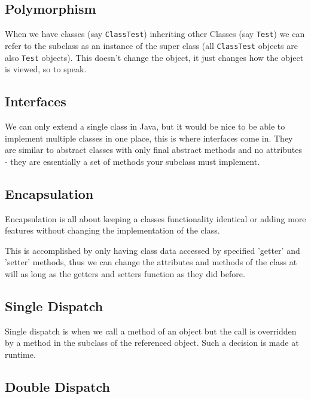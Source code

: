 \documentclass[a4paper, 12pt, twoside]{article}
\begin{document}
\subsection{Polymorphism}

When we have classes (say \texttt{ClassTest}) inheriting other Classes
(say \texttt{Test}) we can refer to the subclass as an instance
of the super class (all \texttt{ClassTest} objects are also
\texttt{Test} objects). This doesn't change the object, it just changes
how the object is viewed, so to speak.

\subsection{Interfaces}

We can only extend a single class in Java, but it would be nice to
be able to implement multiple classes in one place, this is where
interfaces come in. They are similar to abstract classes with
only final abstract methods and no attributes - they are essentially
a set of methods your subclass must implement.

\subsection{Encapsulation}

Encapsulation is all about keeping a classes functionality identical
or adding more features without changing the implementation of the
class. 

\vspace{\baselineskip}

This is accomplished by only having class data accessed by
specified 'getter' and 'setter' methods, thus we can change the
attributes and methods of the class at will as long as the
getters and setters function as they did before.

\subsection{Single Dispatch}

Single dispatch is when we call a method of an object but the call is
overridden by a method in the subclass of the referenced object.
Such a decision is made at runtime.

\subsection{Double Dispatch}
\end{document}

